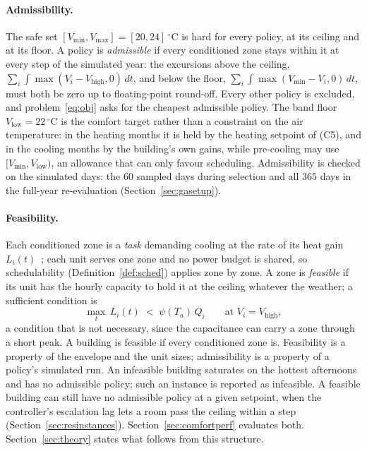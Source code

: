 \documentclass[10pt,a4paper,twocolumn]{article}
\theoremstyle{definition}
\begin{document}
\paragraph{Admissibility.} The safe set $[V_{\min},V_{\max}]=[20,24]\,^{\circ}$C is hard for every policy, at its ceiling and at its floor. A policy is \emph{admissible} if every conditioned zone stays within it at every step of the simulated year: the excursions above the ceiling, $\sum_i\int\max(V_i-V_{\text{high}},0)\,dt$, and below the floor, $\sum_i\int\max(V_{\min}-V_i,0)\,dt$, must both be zero up to floating-point round-off. Every other policy is excluded, and problem~\eqref{eq:obj} asks for the cheapest admissible policy. The band floor $V_{\text{low}}=22\,^{\circ}$C is the comfort target rather than a constraint on the air temperature: in the heating months it is held by the heating setpoint of (C5), and in the cooling months by the building's own gains, while pre-cooling may use $[V_{\min},V_{\text{low}})$, an allowance that can only favour scheduling. Admissibility is checked on the simulated days: the $60$ sampled days during selection and all $365$ days in the full-year re-evaluation (Section~\ref{sec:gasetup}).

\paragraph{Feasibility.}\label{sec:taskmodel} Each conditioned zone is a \emph{task} demanding cooling at the rate of its heat gain $L_i(t)$~\citep{alur2012optimal,nghiem2012scalable}; each unit serves one zone and no power budget is shared, so schedulability (Definition~\ref{def:sched}) applies zone by zone. A zone is \emph{feasible} if its unit has the hourly capacity to hold it at the ceiling whatever the weather; a sufficient condition is
\begin{equation}\label{eq:feasible}
\max_t\,L_i(t)\;<\;\psi(T_a)\,Q_i \qquad\text{at }V_i=V_{\text{high}},
\end{equation}
a condition that is not necessary, since the capacitance can carry a zone through a short peak. A building is feasible if every conditioned zone is. Feasibility is a property of the envelope and the unit sizes; admissibility is a property of a policy's simulated run. An infeasible building saturates on the hottest afternoons and has no admissible policy; such an instance is reported as infeasible. A feasible building can still have no admissible policy at a given setpoint, when the controller's escalation lag lets a room pass the ceiling within a step (Section~\ref{sec:resinstances}). Section~\ref{sec:comfortperf} evaluates both. Section~\ref{sec:theory} states what follows from this structure.
\end{document}
